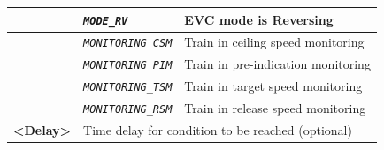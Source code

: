 \documentclass{template/openetcs}
\begin{document}
\begin{itemize}
\begin{longtable}{|l|l|l|}
			\hline
	
			&	\begin{minipage}[t]{0.40\linewidth} \emph{\texttt{MODE\_RV}} \end{minipage}
			&	\begin{minipage}[t]{0.38\linewidth} EVC mode is Reversing \end{minipage} \\ 
	
			\hline
	
			&	\begin{minipage}[t]{0.40\linewidth} \emph{\texttt{MONITORING\_CSM}} \end{minipage}
			&	\begin{minipage}[t]{0.38\linewidth} Train in ceiling speed monitoring \end{minipage} \\ 
	
			\hline
	
			&	\begin{minipage}[t]{0.40\linewidth} \emph{\texttt{MONITORING\_PIM}} \end{minipage}
			&	\begin{minipage}[t]{0.38\linewidth} Train in pre-indication monitoring \end{minipage} \\ 
	
			\hline
	
			&	\begin{minipage}[t]{0.40\linewidth} \emph{\texttt{MONITORING\_TSM}} \end{minipage}
			&	\begin{minipage}[t]{0.38\linewidth} Train in target speed monitoring \end{minipage} \\ 
	
			\hline
	
			&	\begin{minipage}[t]{0.40\linewidth} \emph{\texttt{MONITORING\_RSM}} \end{minipage}
			&	\begin{minipage}[t]{0.38\linewidth} Train in release speed monitoring \end{minipage} \\ 
	
			\hline
							
				
				\begin{minipage}[t]{0.22\linewidth} \textbf{<Delay>} \end{minipage}
			&	\multicolumn{2}{l|}{ \begin{minipage}[t]{0.78\linewidth} Time delay for condition to be reached (optional) \end{minipage} } \\ 
	

\end{longtable}
\end{itemize}
\end{document}
